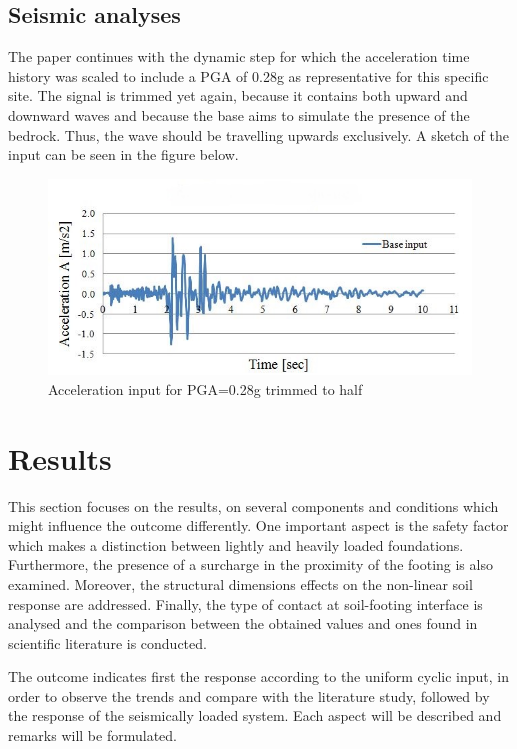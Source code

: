\subsection{Seismic analyses}	 
The paper continues with the dynamic step for which the acceleration time history was scaled to include a PGA of 0.28g as representative for this specific site. The signal is trimmed yet again, because it contains both upward and downward waves and because the base aims to simulate the presence of the bedrock. Thus, the wave should be travelling upwards exclusively. A sketch of the input can be seen in the figure below.
	
	\begin{figure}[!h]
		\centering
		\includegraphics[width=0.9\linewidth]{"input_acc"}
		\caption{Acceleration input for PGA=0.28g trimmed to half}
		\label{inputacc}
	\end{figure}

\section{Results}
This section focuses on the results, on several components and conditions which might influence the outcome differently. One important aspect is the safety factor which makes a distinction between lightly and heavily loaded foundations. Furthermore, the presence of a surcharge in the proximity of the footing is also examined. Moreover, the structural dimensions effects on the non-linear soil response are addressed. Finally, the type of contact at soil-footing interface is analysed and the comparison between the obtained values and ones found in scientific literature is conducted.

The outcome indicates first the response according to the uniform cyclic input, in order to observe the trends and compare with the literature study, followed by the response of the seismically loaded system. Each aspect will be described and remarks will be formulated.

